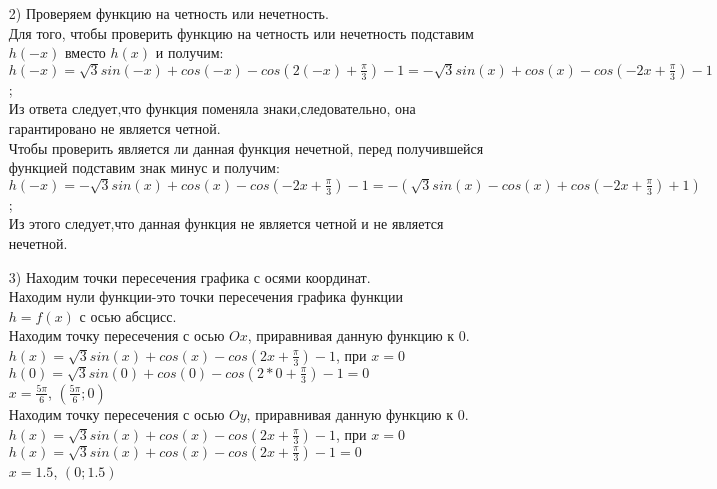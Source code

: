 \documentclass[russian,utf8,nocolumnxxxi,nocolumnxxxii]{eskdtext}
\begin{document}
    \begin{enumerate}
\item[2)]Проверяем функцию на четность или нечетность.\\
    Для того, чтобы проверить функцию на четность или нечетность подставим $h(-x)$ вместо $h(x)$ и получим:\\
    $h(-x)=\sqrt{3}sin(-x)+cos(-x)-cos(2(-x)+\frac{\pi}{3})-1=-\sqrt{3}sin(x)+cos(x)-cos(-2x+\frac{\pi}{3})-1$;\\
    Из ответа следует,что функция поменяла знаки,следовательно, она гарантировано не является четной.\\
    Чтобы проверить является ли данная функция нечетной, перед получившейся функцией подставим знак минус и получим:\\
    $h(-x)=-\sqrt{3}sin(x)+cos(x)-cos(-2x+\frac{\pi}{3})-1=-(\sqrt{3}sin(x)-cos(x)+cos(-2x+\frac{\pi}{3})+1)$;\\
    Из этого следует,что данная функция не является четной и не является нечетной.
   
    \item[3)]Находим точки пересечения графика с осями координат.\\
    Находим нули функции-это точки пересечения графика функции\\
    $h=f(x)$ с осью абсцисс.\\
    Находим точку пересечения с осью $Ox$, приравнивая данную функцию к $0$.\\
    $h(x)=\sqrt{3}sin(x)+cos(x)-cos(2x+\frac{\pi}{3})-1$, при $x=0$\\
    $h(0)=\sqrt{3}sin(0)+cos(0)-cos(2*0+\frac{\pi}{3})-1=0$\\
    $x=\frac{5\pi}{6}$, $(\frac{5\pi}{6};0)$\\
    Находим точку пересечения с осью $Oy$, приравнивая данную функцию к $0$.\\
    $h(x)=\sqrt{3}sin(x)+cos(x)-cos(2x+\frac{\pi}{3})-1$, при $x=0$\\
    $h(x)=\sqrt{3}sin(x)+cos(x)-cos(2x+\frac{\pi}{3})-1=0$\\
    $x=1.5$, $(0;1.5)$\\
    

\end{enumerate}
\end{document}
